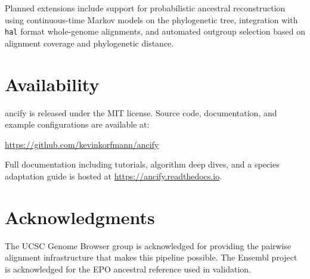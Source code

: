 \documentclass[11pt,a4paper]{article}
\begin{document}
Planned extensions include support for probabilistic ancestral reconstruction
using continuous-time Markov models on the phylogenetic tree, integration with
\texttt{hal} format whole-genome alignments, and automated outgroup selection
based on alignment coverage and phylogenetic distance.

\section{Availability}
\label{sec:availability}

ancify is released under the MIT license. Source code, documentation, and
example configurations are available at:

\begin{center}
\url{https://github.com/kevinkorfmann/ancify}
\end{center}

\noindent Full documentation including tutorials, algorithm deep dives, and a
species adaptation guide is hosted at
\url{https://ancify.readthedocs.io}.

\section*{Acknowledgments}

The UCSC Genome Browser group is acknowledged for providing the pairwise
alignment infrastructure that makes this pipeline possible. The Ensembl
project is acknowledged for the EPO ancestral reference used in validation.



\end{document}
